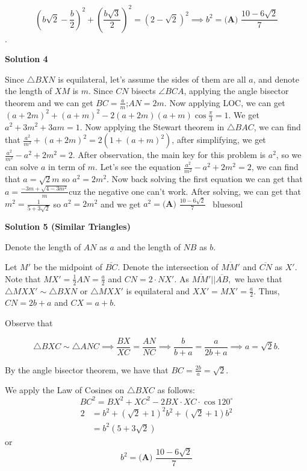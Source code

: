 \begin{enumerate}
 
 \[\left (b\sqrt{2} - \frac{b}{2} \right)^2 + \left(\frac{b\sqrt{3}}{2} \right)^2 = \left(2 - \sqrt{2} \right)^2 \implies b^2 = \boxed{\textbf{(A) } \frac{10-6\sqrt{2}}{7}}\].

 


 



\textbf{Solution 4}

Since $\triangle BXN$ is equilateral, let's assume the sides of them are all $a$, and denote the length of $XM$ is $m$. Since $CN$ bisects $\angle BCA$, applying the angle bisector theorem and we can get $BC=\frac{a}{m}$;$AN=2m$. Now applying LOC, we can get $(a+2m)^2+(a+m)^2-2(a+2m)(a+m)\cos\frac{\pi}{3}=1$. We get $a^2+3m^2+3am=1$. Now applying the Stewart theorem in $\triangle BAC$, we can find that ${\frac{a^2}{m^2}+(a+2m)^2=2(1+(a+m)^2)}$, after simplifying, we get ${\frac{a^2}{m^2}-a^2+2m^2=2}$. After observation, the main key for this problem is $a^2$, so we can solve $a$ in term of $m$. Let's see the equation ${\frac{a^2}{m^2}-a^2+2m^2=2}$, we can find that $a=\sqrt{2}m$ so $a^2=2m^2$. Now back solving the first equation we can get that $a=\frac{-3m+\sqrt{4-3m^2}}{m}$cuz the negative one can't work. After solving, we can get that $m^2=\frac{1}{5+3\sqrt{2}}$ so $a^2=2m^2$ and we get $a^2 = \boxed{\textbf{(A) } \frac{10-6\sqrt{2}}{7}}$~ bluesoul

 



\textbf{Solution 5 (Similar Triangles)}

Denote the length of $AN$ as $a$ and the length of $NB$ as $b.$

 Let $M'$ be the midpoint of $\overline{BC} .$ Denote the intersection of $\overline{MM'}$ and $\overline{CN}$ as $X' .$ Note that $MX' = \frac12 AN = \frac{a}{2}$ and $CN = 2\cdot NX' .$ As $\overline{MM'} || \overline{AB},$ we have that $\triangle MXX' \sim \triangle BXN$ or $\triangle MXX'$ is equilateral and $XX' =MX' = \frac{a}{2}.$ Thus, $CN = 2b+a$ and $CX=a+b.$

 Observe that 

 
 \[\triangle BXC\sim \triangle ANC \implies \frac{BX}{XC} =\frac{AN}{NC} \implies \frac{b}{b+a} = \frac{a}{2b+a} \implies a = \sqrt 2 b.\]

 By the angle bisector theorem, we have that $BC=\frac{2b}{a} = \sqrt 2.$

 We apply the Law of Cosines on $\triangle BXC$ as follows:
 \[BC^2=BX^2+XC^2-2BX\cdot XC\cdot \cos120^\circ\]
 \begin{align*} 2&=b^2+(\sqrt 2+1)^2b^2 +(\sqrt2 + 1)b^2 \\ &=b^2(5+3\sqrt 2) \end{align*}
or
 \[\boxed{b^2=\textbf{(A) } \frac{10-6\sqrt{2}}{7}}\]





\end{enumerate}
